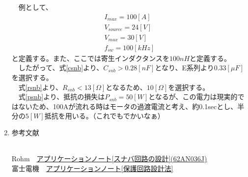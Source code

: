 \documentclass[12pt,a4paper,dvipdfmx]{jarticle}
\begin{document}
\begin{enumerate}
		　例として、
		\begin{eqnarray}
			I_{max} = 100 [A]\\
			V_{source} = 24 [V]\\
			V_{max} = 30 [V]\\
			f_{sw} = 100 [kHz]
		\end{eqnarray}
		と定義する。また、ここでは寄生インダクタンスを$100nH$と定義する。\\
		　したがって、式\ref{csnb}より、$C_{snb}　> 0.28 [nF]$となり、E系列より$0.33[\mu F]$を選択する。\\
		 　式\ref{rsnb}より、$R_{snb} < 13 [\Omega]$となるため、$10 [\Omega]$を選択する。\\
		 　式\ref{psnb}より、抵抗の損失は$P_{snb} = 50[W]$となるが、この電力は現実的ではないため、100Aが流れる時はモータの過渡電流と考え、約0.1secとし、半分の$5[W]$抵抗を用いる。（これでもでかいなぁ）
	\item \hypertarget{section4}{参考文献}\\
		Rohm　\href{https://fscdn.rohm.com/jp/products/databook/applinote/discrete/sic/mosfet/sic-mos_snubber_circuit_design_an-j.pdf}{アプリケーションノート[スナバ回路の設計](62AN036J)}\\
		富士電機　\href{https://www.fujielectric.co.jp/products/semiconductor/model/igbt/application/igbt.html}{アプリケーションノート[保護回路設計法]}
		
\end{enumerate}
\end{document}
